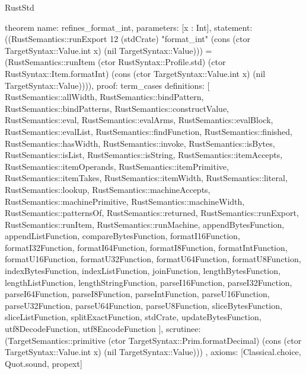 \begin{lexlean}{RustStd}
\begin{semanticmodule}
theorem{
  name: refines_format_int,
  parameters: [x : Int],
  statement: ((RustSemantics::runExport 12 (stdCrate) "format_int" (cons (ctor TargetSyntax::Value.int x) (nil TargetSyntax::Value))) = (RustSemantics::runItem (ctor RustSyntax::Profile.std) (ctor RustSyntax::Item.formatInt) (cons (ctor TargetSyntax::Value.int x) (nil TargetSyntax::Value)))),
  proof: term_cases{
    definitions: [
      RustSemantics::allWidth,
      RustSemantics::bindPattern,
      RustSemantics::bindPatterns,
      RustSemantics::constructValue,
      RustSemantics::eval,
      RustSemantics::evalArms,
      RustSemantics::evalBlock,
      RustSemantics::evalList,
      RustSemantics::findFunction,
      RustSemantics::finished,
      RustSemantics::hasWidth,
      RustSemantics::invoke,
      RustSemantics::isBytes,
      RustSemantics::isList,
      RustSemantics::isString,
      RustSemantics::itemAccepts,
      RustSemantics::itemOperands,
      RustSemantics::itemPrimitive,
      RustSemantics::itemTakes,
      RustSemantics::itemWidth,
      RustSemantics::literal,
      RustSemantics::lookup,
      RustSemantics::machineAccepts,
      RustSemantics::machinePrimitive,
      RustSemantics::machineWidth,
      RustSemantics::patternsOf,
      RustSemantics::returned,
      RustSemantics::runExport,
      RustSemantics::runItem,
      RustSemantics::runMachine,
      appendBytesFunction,
      appendListFunction,
      compareBytesFunction,
      formatI16Function,
      formatI32Function,
      formatI64Function,
      formatI8Function,
      formatIntFunction,
      formatU16Function,
      formatU32Function,
      formatU64Function,
      formatU8Function,
      indexBytesFunction,
      indexListFunction,
      joinFunction,
      lengthBytesFunction,
      lengthListFunction,
      lengthStringFunction,
      parseI16Function,
      parseI32Function,
      parseI64Function,
      parseI8Function,
      parseIntFunction,
      parseU16Function,
      parseU32Function,
      parseU64Function,
      parseU8Function,
      sliceBytesFunction,
      sliceListFunction,
      splitExactFunction,
      stdCrate,
      updateBytesFunction,
      utf8DecodeFunction,
      utf8EncodeFunction
    ],
    scrutinee: (TargetSemantics::primitive (ctor TargetSyntax::Prim.formatDecimal) (cons (ctor TargetSyntax::Value.int x) (nil TargetSyntax::Value)))
  },
  axioms: [Classical.choice, Quot.sound, propext]
}


\end{semanticmodule}
\end{lexlean}
